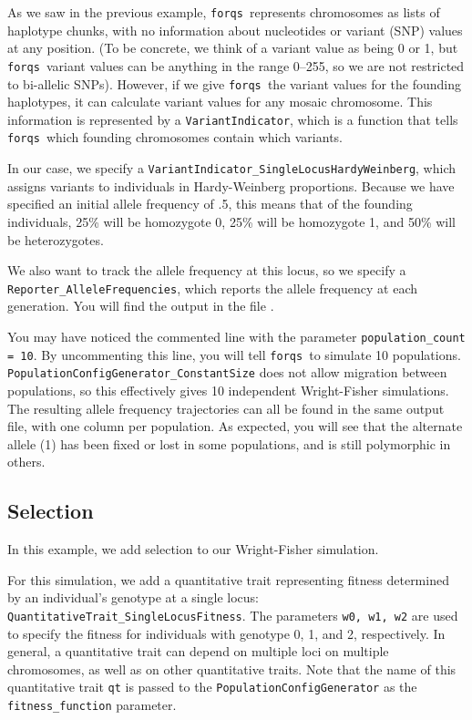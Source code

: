 \documentclass{article}
\newcommand{\forqs}[0]{\texttt{forqs }}
\newcommand{\codeinput}[1]{\begin{small}  \end{small}}
\begin{document}
As we saw in the previous example, \forqs represents chromosomes as lists of
haplotype chunks, with no information about nucleotides or variant (SNP) values
at any position.  (To be concrete, we think of a variant value as being 0 or 1,
but \forqs variant values can be anything in the range 0--255, so we are not
restricted to bi-allelic SNPs).  However, if we give \forqs the variant values
for the founding haplotypes, it can calculate variant values for any mosaic
chromosome.  This information is represented by a \texttt{VariantIndicator},
which is a function that tells \forqs which founding chromosomes contain which
variants.

In our case, we specify a \texttt{VariantIndicator\_SingleLocusHardyWeinberg},
which assigns variants to individuals in Hardy-Weinberg proportions.  Because
we have specified an initial allele frequency of .5, this means that of the
founding individuals, 25\% will be homozygote 0, 25\% will be homozygote 1, and
50\% will be heterozygotes.

We also want to track the allele frequency at this locus, so we specify a
\texttt{Reporter\_AlleleFrequencies}, which reports the allele frequency
at each generation.  You will find the output in the file 
.

\begin{sloppypar}
You may have noticed the commented line with the parameter \texttt{population\_count = 10}.
By uncommenting this line, you will tell \forqs to simulate 10 populations.  
\texttt{PopulationConfigGenerator\_ConstantSize} does not allow migration between 
populations, so this effectively gives 10 independent Wright-Fisher simulations.  The
resulting allele frequency trajectories can all be found in the same output file,
with one column per population.  As expected, you will see that the alternate allele
(1) has been fixed or lost in some populations, and is still polymorphic
in others.
\end{sloppypar}


\subsection{Selection}

In this example, we add selection to our Wright-Fisher simulation.

\codeinput{../examples/tutorial_3_selection.txt}

\begin{sloppypar}
For this simulation, we add a quantitative trait representing fitness
determined by an individual's genotype at a single locus:
\texttt{QuantitativeTrait\_SingleLocusFitness}.  The parameters \texttt{w0, w1,
w2} are used to specify the fitness for individuals with genotype 0, 1, and 2,
respectively.  In general, a quantitative trait can depend on multiple loci on
multiple chromosomes, as well as on other quantitative traits.  Note that the
name of this quantitative trait \texttt{qt} is passed to the 
\texttt{PopulationConfigGenerator} as the \texttt{fitness\_function} parameter.
\end{sloppypar}
\end{document}
